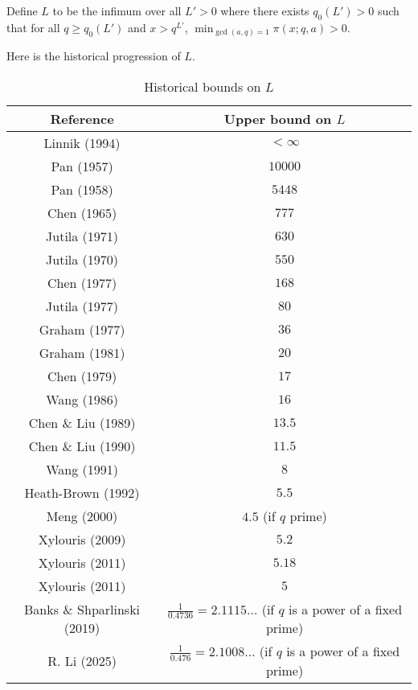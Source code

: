 \begin{definition}
Define $L$ to be the infimum over all $L'>0$ where there exists $q_0(L')>0$ such that for all $q\geq q_0(L')$ and $x>q^{L'}$, $\min_{\gcd(a,q)=1}\pi(x;q,a)>0$.
\end{definition}

Here is the historical progression of $L$.

\begin{table}[ht]
    \def\arraystretch{1.2}
    \centering
    \caption{Historical bounds on $L$}
    \begin{tabular}{|c|c|}
    \hline
    Reference & Upper bound on $L$\\
    \hline
    Linnik (1994) \cite{linnik-1} & $<\infty$\\
    \hline
    Pan (1957) \cite{pan_1957} & $10000$\\
    \hline
    Pan (1958) \cite{pan_1958} & $5448$\\
    \hline
    Chen (1965) \cite{chen_1965} & $777$\\
    \hline
    Jutila (1971) \cite{} & $630$ \\
    \hline
    Jutila (1970) \cite{jutila_1970} & $550$ \\
    \hline
    Chen (1977) \cite{chen_1977} & $168$\\
    \hline
    Jutila (1977) \cite{jutila_1977} & $80$\\
    \hline
    Graham (1977) \cite{graham_1977} & $36$\\
    \hline
    Graham (1981) \cite{graham_1981} & $20$\\
    \hline
    Chen (1979) \cite{chen_1979} & $17$\\
    \hline
    Wang (1986) \cite{wang_1986} & $16$\\
    \hline
    Chen \& Liu (1989) \cite{chen_liu_1989} & $13.5$\\
    \hline
    Chen \& Liu (1990) \cite{chen-liu-v} & $11.5$\\
    \hline
    Wang (1991) \cite{wang_1991} & $8$\\
    \hline
    Heath-Brown (1992) \cite{heath_brown_least_prime} & $5.5$\\
    \hline
    Meng (2000) \cite{meng} & $4.5$ (if $q$ prime)\\
    \hline
    Xylouris (2009) \cite{xylouris_thesis_2009} & $5.2$\\
    \hline
    Xylouris (2011) \cite{xylouris_2011} & $5.18$\\
    \hline
    Xylouris (2011) \cite{xylouris_thesis_2011} & $5$\\
    \hline
    Banks \& Shparlinski (2019) \cite{Banks_Shparlinski_2019} & $\frac{1}{0.4736} = 2.1115\dots$ (if $q$ is a power of a fixed prime)\\
    \hline
    R. Li (2025) \cite{li_number_2025} & $\frac{1}{0.476} = 2.1008\dots$ (if $q$ is a power of a fixed prime)\\
    \hline
    \end{tabular}
\label{bt-l-table}
\end{table}

